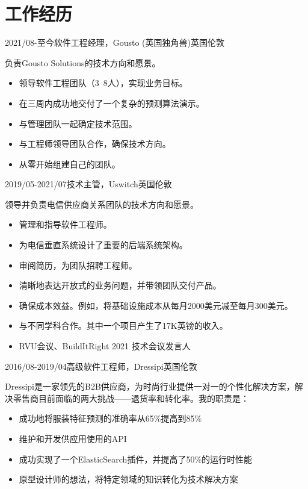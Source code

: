 \documentclass[a4paper]{twentysecondcv-chinese} %
\begin{document}
\section{工作经历}

\begin{twenty} %
	\twentyitem
	    {2021/08-至今}{软件工程经理，Gousto (英国独角兽)}{英国伦敦}
    	{负责Gousto Solutions的技术方向和愿景。
        	\begin{itemize}
        	    \item 领导软件工程团队（3~8人），实现业务目标。
        	    \item 在三周内成功地交付了一个复杂的预测算法演示。
              \item 与管理团队一起确定技术范围。
              \item 与工程师领导团队合作，确保技术方向。
              \item 从零开始组建自己的团队。
            \end{itemize}}
	\twentyitem
	    {2019/05-2021/07}{技术主管，Uswitch}{英国伦敦}
    	{领导并负责电信供应商关系团队的技术方向和愿景。
        	\begin{itemize}
              \item 管理和指导软件工程师。
              \item 为电信垂直系统设计了重要的后端系统架构。
              \item 审阅简历，为团队招聘工程师。
              \item 清晰地表达开放式的业务问题，并带领团队交付产品。
              \item 确保成本效益。例如，将基础设施成本从每月2000美元减至每月300美元。
              \item 与不同学科合作。其中一个项目产生了17K英镑的收入。
              \item RVU会议、BuildItRight 2021 技术会议发言人
            \end{itemize}}
	\twentyitem
	    {2016/08-2019/04}{高级软件工程师，Dressipi}{英国伦敦}
    	{Dressipi是一家领先的B2B供应商，为时尚行业提供一对一的个性化解决方案，解决零售商目前面临的两大挑战——退货率和转化率。我的职责是：
        	\begin{itemize}
              \item 成功地将服装特征预测的准确率从65\%提高到85\%
              \item 维护和开发供应用使用的API
              \item 成功实现了一个ElasticSearch插件，并提高了50\%的运行时性能
              \item 原型设计师的想法，将特定领域的知识转化为技术解决方案

\end{itemize}}
\end{twenty}
\end{document}
